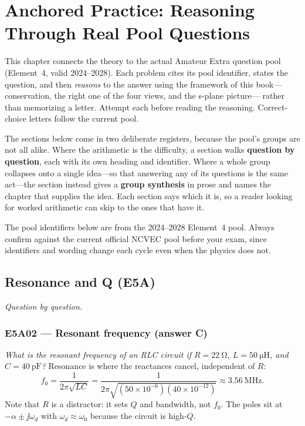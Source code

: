 \chapter{Anchored Practice: Reasoning Through Real Pool Questions}
\label{ch:practice}
This chapter connects the theory to the actual Amateur Extra question pool
(Element~4, valid 2024--2028). Each problem cites its pool identifier, states the
question, and then \emph{reasons} to the answer using the framework of this
book---conservation, the right one of the four views, and the s-plane picture---
rather than memorizing a letter. Attempt each before reading the reasoning.
Correct-choice letters follow the current pool.

The sections below come in two deliberate registers, because the pool's groups are
not all alike. Where the arithmetic is the difficulty, a section walks
\textbf{question by question}, each with its own heading and identifier. Where a whole
group collapses onto a single idea---so that answering any of its questions is the
same act---the section instead gives a \textbf{group synthesis} in prose and names the
chapter that supplies the idea. Each section says which it is, so a reader looking for
worked arithmetic can skip to the ones that have it.

\begin{exambox}
The pool identifiers below are from the 2024--2028 Element~4 pool. Always confirm
against the current official NCVEC pool before your exam, since identifiers and
wording change each cycle even when the physics does not.
\end{exambox}

\section{Resonance and Q (E5A)}
\emph{Question by question.}

\subsection*{E5A02 --- Resonant frequency (answer C)}
\emph{What is the resonant frequency of an RLC circuit if \(R=\SI{22}{\ohm}\),
\(L=\SI{50}{\micro\henry}\), and \(C=\SI{40}{\pico\farad}\)?}
Resonance is where the reactances cancel, independent of \(R\):
\[
f_0=\frac{1}{2\pi\sqrt{LC}}
=\frac{1}{2\pi\sqrt{(50\times10^{-6})(40\times10^{-12})}}
\approx\SI{3.56}{\mega\hertz}.
\]
Note that \(R\) is a distractor: it sets \(Q\) and bandwidth, not \(f_0\). The
poles sit at \(-\alpha\pm\jj\omega_d\) with \(\omega_d\approx\omega_0\) because the
circuit is high-\(Q\).

